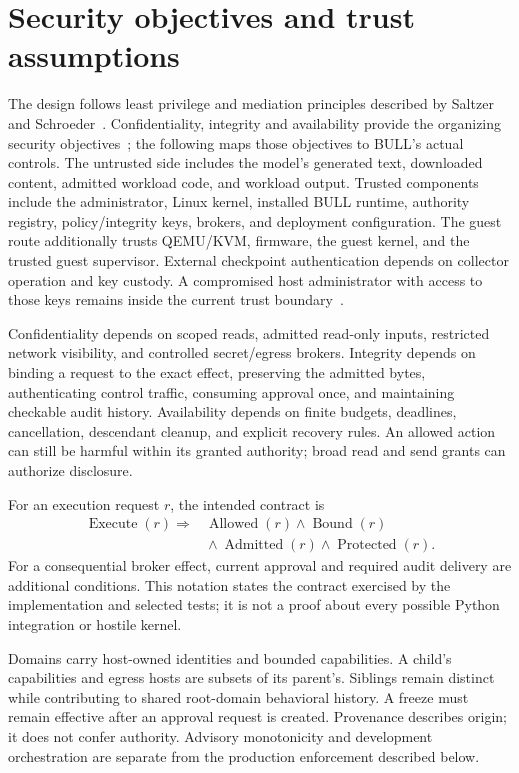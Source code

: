 \documentclass[journal]{IEEEtran}
\begin{document}
\section{Security objectives and trust assumptions}
The design follows least privilege and mediation principles described by Saltzer and Schroeder~\cite{E_Saltzer}. Confidentiality, integrity and availability provide the organizing security objectives~\cite{E_FIPS199}; the following maps those objectives to BULL's actual controls.
The untrusted side includes the model's generated text, downloaded content, admitted workload code, and workload output. Trusted components include the administrator, Linux kernel, installed BULL runtime, authority registry, policy/integrity keys, brokers, and deployment configuration. The guest route additionally trusts QEMU/KVM, firmware, the guest kernel, and the trusted guest supervisor. External checkpoint authentication depends on collector operation and key custody. A compromised host administrator with access to those keys remains inside the current trust boundary~\cite{claims}.

Confidentiality depends on scoped reads, admitted read-only inputs, restricted network visibility, and controlled secret/egress brokers. Integrity depends on binding a request to the exact effect, preserving the admitted bytes, authenticating control traffic, consuming approval once, and maintaining checkable audit history. Availability depends on finite budgets, deadlines, cancellation, descendant cleanup, and explicit recovery rules. An allowed action can still be harmful within its granted authority; broad read and send grants can authorize disclosure.

For an execution request $r$, the intended contract is
\[
\begin{aligned}
\operatorname{Execute}(r)\Rightarrow{}&\operatorname{Allowed}(r)\land\operatorname{Bound}(r)\\
&{}\land\operatorname{Admitted}(r)\land\operatorname{Protected}(r).
\end{aligned}
\]
For a consequential broker effect, current approval and required audit delivery are additional conditions. This notation states the contract exercised by the implementation and selected tests; it is not a proof about every possible Python integration or hostile kernel.

Domains carry host-owned identities and bounded capabilities. A child's capabilities and egress hosts are subsets of its parent's. Siblings remain distinct while contributing to shared root-domain behavioral history. A freeze must remain effective after an approval request is created. Provenance describes origin; it does not confer authority. Advisory monotonicity and development orchestration are separate from the production enforcement described below.
\end{document}
